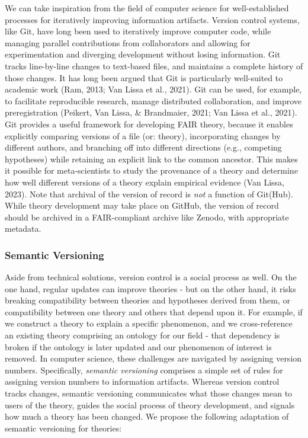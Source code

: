 \documentclass[
  man, noextraspace,floatsintext]{apa6}
\begin{document}
We can take inspiration from the field of computer science for well-established processes for iteratively improving information artifacts.
Version control systems, like Git, have long been used to iteratively improve computer code, while managing parallel contributions from collaborators and allowing for experimentation and diverging development without losing information.
Git tracks line-by-line changes to text-based files,
and maintains a complete history of those changes.
It has long been argued that Git is particularly well-suited to academic work (Ram, 2013; Van Lissa et al., 2021).
Git can be used, for example, to facilitate reproducible research, manage distributed collaboration, and improve preregistration (Peikert, Van Lissa, \& Brandmaier, 2021; Van Lissa et al., 2021).
Git provides a useful framework for developing FAIR theory,
because it enables explicitly comparing versions of a file (or: theory),
incorporating changes by different authors,
and branching off into different directions (e.g., competing hypotheses) while retaining an explicit link to the common ancestor.
This makes it possible for meta-scientists to study the provenance of a theory and determine how well different versions of a theory explain empirical evidence (Van Lissa, 2023).
Note that archival of the version of record is \emph{not} a function of Git(Hub).
While theory development may take place on GitHub, the version of record should be archived in a FAIR-compliant archive like Zenodo, with appropriate metadata.

\subsubsection{Semantic Versioning}\label{semantic-versioning}

Aside from technical solutions, version control is a social process as well.
On the one hand, regular updates can improve theories - but on the other hand, it risks breaking compatibility between theories and hypotheses derived from them, or compatibility between one theory and others that depend upon it.
For example, if we construct a theory to explain a specific phenomenon, and we cross-reference an existing theory comprising an ontology for our field - that dependency is broken if the ontology is later updated and our phenomenon of interest is removed.
In computer science, these challenges are navigated by assigning version numbers.
Specifically, \emph{semantic versioning} comprises a simple set of rules for assigning version numbers to information artifacts.
Whereas version control tracks changes,
semantic versioning communicates what those changes mean to users of the theory,
guides the social process of theory development, and signals how much a theory has been changed.
We propose the following adaptation of semantic versioning for theories:
\end{document}
